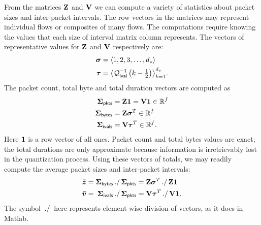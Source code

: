 \documentclass[twocolumn,final]{svjour3}
\begin{document}
From the matrices $\mathbf{Z}$ and $\mathbf{V}$ we can compute a variety of statistics about packet sizes and inter-packet intervals.
The row vectors in the matrices may represent individual flows or composites of many flows.
The computations require knowing the values that each size of interval matrix column represents.
The vectors of representative values for $\mathbf{Z}$ and $\mathbf{V}$ respectively are:
\begin{align}
\vec{\sigma} &= \tuple{1,2,3,\dots,d_z} \\
\vec{\tau}   &= \tuple{\Df_\ival\left(k-\smallfrac{1}{2}\right)}_{k=1}^{d_v}.
\end{align}
The packet count, total byte and total duration vectors are computed as
\begin{align}
\vec{\Sigma}_\pkts  &= \mat{Z}\ones = \mat{V}\ones \in \R^f \eqn{packet-count}\\
\vec{\Sigma}_\bytes &= \mat{Z}\trans{\vec{\sigma}} \in \R^f \eqn{total-bytes} \\
\vec{\Sigma}_\ivals &= \mat{V}\trans{\vec{\tau}} \in \R^f \eqn{total-duration}.
\end{align}
Here $\mathbf{1}$ is a row vector of all ones.\onesnote
Packet count and total bytes values are exact;
the total durations are only approximate because information is irretrievably lost in the quantization process.
Using these vectors of totals, we may readily compute the average packet sizes and inter-packet intervals:
\begin{align}
\vec{\mean{z}} &=
  \vec{\Sigma}_\bytes \eldiv \vec{\Sigma}_\pkts
  \phantom{= \mat{V}\trans{\vec{\tau}} \eldiv \mat{V}\ones}
  \mathllap{= \mat{Z}\trans{\vec{\sigma}} \eldiv \mat{Z}\ones} \\
\vec{\mean{v}} &=
  \phantom{\vec{\Sigma}_\bytes \eldiv \vec{\Sigma}_\pkts}
  \mathllap{\vec{\Sigma_{\ivals}} \eldiv \vec{\Sigma_{\pkts}}}
  = \mat{V}\trans{\vec{\tau}} \eldiv \mat{V}\ones.
\end{align}
The symbol $\,./\,$ here represents element-wise division of vectors, as it does in Matlab.
\end{document}
